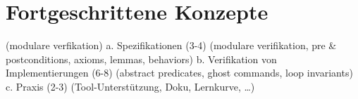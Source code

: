    

\chapter{Fortgeschrittene Konzepte}
(modulare verfikation)
a. Spezifikationen (3-4)
            (modulare verifikation, pre & postconditions, axioms, lemmas, behaviors)
b. Verifikation von Implementierungen (6-8)
            (abstract predicates, ghost commands, loop invariants)
c. Praxis (2-3)
  (Tool-Unterstützung, Doku, Lernkurve, …)